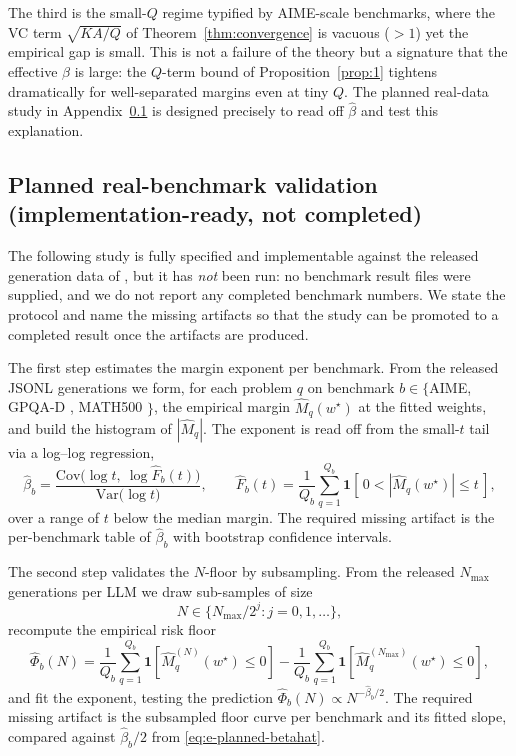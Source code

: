 \documentclass{article} %
\providecommand{\Mhat}{\widehat{M}}
\providecommand{\wstar}{w^{\star}}
\begin{document}
The third is the small-$Q$ regime typified by AIME-scale benchmarks, where the
VC term $\sqrt{KA/Q}$ of Theorem~\ref{thm:convergence} is vacuous ($>1$) yet
the empirical gap is small.  This is not a failure of the theory but a
signature that the effective $\beta$ is large: the $Q$-term bound of
Proposition~\ref{prop:1} tightens dramatically for well-separated margins even
at tiny $Q$.  The planned real-data study in Appendix~\ref{app:exp-planned} is
designed precisely to read off $\widehat\beta$ and test this explanation.

\subsection{Planned real-benchmark validation (implementation-ready, not
completed)}
\label{app:exp-planned}

The following study is fully specified and implementable against the released
generation data of \cite{komiyama2026best}, but it has \emph{not} been run: no
benchmark result files were supplied, and we do not report any completed
benchmark numbers.  We state the protocol and name the missing artifacts so
that the study can be promoted to a completed result once the artifacts are
produced.

The first step estimates the margin exponent per benchmark.  From the released
JSONL generations we form, for each problem $q$ on benchmark $b\in\{$AIME,
GPQA-D \cite{rein2023gpqaag}, MATH500 \cite{hendrycks2021measuringmp}$\}$, the
empirical margin $\Mhat_q(\wstar)$ at the fitted weights, and build the
histogram of $|\Mhat_q|$.  The exponent is read off from the small-$t$ tail via
a log--log regression,
\begin{equation}
\label{eq:e-planned-betahat}
\widehat\beta_b
=
\frac{\mathrm{Cov}\big(\log t,\ \log \widehat{F}_b(t)\big)}
{\mathrm{Var}\big(\log t\big)},
\qquad
\widehat{F}_b(t)=\frac1{Q_b}\sum_{q=1}^{Q_b}
\mathbf 1\!\left[\,0<|\Mhat_q(\wstar)|\le t\,\right],
\end{equation}
over a range of $t$ below the median margin.  The required missing artifact is
the per-benchmark table of $\widehat\beta_b$ with bootstrap confidence
intervals.

The second step validates the $N$-floor by subsampling.  From the released
$N_{\max}$ generations per LLM we draw sub-samples of size
\begin{equation}
\label{eq:e-planned-Nsub}
N\in\{N_{\max}/2^j : j=0,1,\dots\},
\end{equation}
recompute the empirical risk floor
\begin{equation}
\label{eq:e-planned-floor}
\widehat\Phi_b(N)=
\frac1{Q_b}\sum_{q=1}^{Q_b}
\mathbf 1\!\left[\Mhat_q^{(N)}(\wstar)\le 0\right]
-
\frac1{Q_b}\sum_{q=1}^{Q_b}
\mathbf 1\!\left[\Mhat_q^{(N_{\max})}(\wstar)\le 0\right],
\end{equation}
and fit the exponent, testing the prediction
$\widehat\Phi_b(N)\propto N^{-\widehat\beta_b/2}$.  The required missing
artifact is the subsampled floor curve per benchmark and its fitted slope,
compared against $\widehat\beta_b/2$ from \eqref{eq:e-planned-betahat}.
\end{document}
